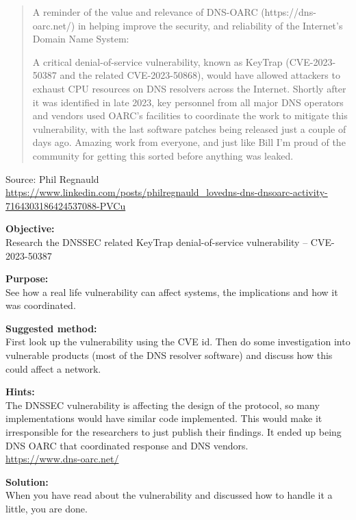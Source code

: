 \documentclass[a4paper,11pt,notitlepage]{report}
\begin{document}
\begin{quote}\footnotesize
A reminder of the value and relevance of DNS-OARC  (https://dns-oarc.net/) in helping improve the security, and reliability of the Internet's Domain Name System:

A critical denial-of-service vulnerability, known as KeyTrap (CVE-2023-50387 and the related CVE-2023-50868), would have allowed  attackers to exhaust CPU resources on DNS resolvers across the Internet. Shortly after it was identified in late 2023, key personnel from all major DNS operators and vendors used OARC's facilities to coordinate the work to mitigate this vulnerability, with the last software patches being released just a couple of days ago. Amazing work from everyone, and just like Bill I'm proud of the community for getting this sorted before anything was leaked.

\end{quote}
Source: Phil Regnauld\\{\scriptsize
 \url{https://www.linkedin.com/posts/philregnauld_lovedns-dns-dnsoarc-activity-7164303186424537088-PVCu}}

{\bf Objective:}\\
Research the DNSSEC related KeyTrap denial-of-service vulnerability -- CVE-2023-50387

{\bf Purpose:}\\
See how a real life vulnerability can affect systems, the implications and how it was coordinated.

{\bf Suggested method:}\\
First look up the vulnerability using the CVE id. Then do some investigation into vulnerable products (most of the DNS resolver software) and discuss how this could affect a network.

{\bf Hints:}\\
The DNSSEC vulnerability is affecting the design of the protocol, so many implementations would have similar code implemented. This would make it irresponsible for the researchers to just publish their findings.
It ended up being DNS OARC that coordinated response and DNS vendors.\\
\url{https://www.dns-oarc.net/}

{\bf Solution:}\\
When you have read about the vulnerability and discussed how to handle it a little, you are done.
\end{document}
